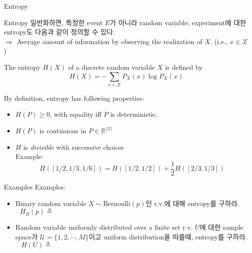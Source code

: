 \documentclass[9pt]{beamer}
\begin{document}
\begin{section}{Entropy}
        \begin{frame}{Entropy}
            일반화하면, 특정한 event $E$가 아니라 random variable; experiment에 대한 entropy도 다음과 같이 정의할 수 있다.
            \\ $\Rightarrow$ \alert{Average} amount of information by observing the realization of $X$. (i.e., $x \in \mathcal X$)
            \begin{definition}
                The entropy $H(X)$ of a discrete random variable $X$ is defined by
                $$H(X) = - \sum_{x \in \mathcal X} P_X(x) \log P_X(x)$$
            \end{definition}
            \vspace{0.3cm}
            By definition, entropy has following properties:
            \begin{itemize}
                \item $H(P)\ge 0$, with equality iff $P$ is deterministic.
                \item $H(P)$ is continuous in $P \in \mathbb R^{|\mathcal X|}$
                \item $H$ is \textit{divisible} with successive choices
                \\ Example:
                $$ H([1 / 2,1 / 3,1 / 6])=H([1 / 2,1 / 2])+\frac{1}{2} H([2 / 3,1 / 3]) $$
            \end{itemize}
            \vspace{0.5cm}
        \end{frame}


        \begin{frame}{Examples}
            Examples:
             \begin{itemize}
                \item Binary random variable
                $X \sim \text{Bernoulli}(p)$인 r.v.에 대해 entropy를 구하라.
                $$H_B(p) \triangleq \qquad \qquad \qquad \qquad \qquad \qquad  \qquad \qquad \qquad \qquad \qquad \qquad  \qquad \qquad $$
                \vspace{2cm}
                \item Random variable uniformly distributed over a finite set
                r.v. $U$에 대한 sample space가 $\mathcal U = \{1, 2, \cdots, M\}$이고 uniform distribution을 따를때, entropy를 구하라.
                $$H(U) \triangleq \qquad \qquad \qquad \qquad \qquad \qquad  \qquad \qquad \qquad \qquad \qquad \qquad  \qquad \qquad $$
            \end{itemize}
        \end{frame}


\end{section}
\end{document}
